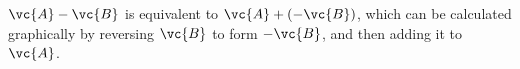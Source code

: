 $\vc{A}-\vc{B}$ is equivalent to $\vc{A}+(-\vc{B})$, which can be calculated graphically by
 reversing $\vc{B}$ to form $-\vc{B}$, and
then adding it to $\vc{A}$.




